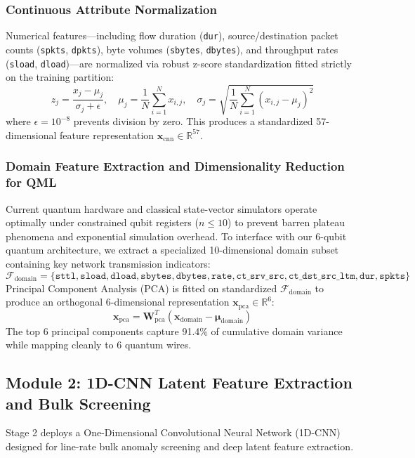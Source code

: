 \documentclass[preprint,12pt]{elsarticle}
\begin{document}
\subsubsection{Continuous Attribute Normalization}
Numerical features—including flow duration (\texttt{dur}), source/destination packet counts (\texttt{spkts}, \texttt{dpkts}), byte volumes (\texttt{sbytes}, \texttt{dbytes}), and throughput rates (\texttt{sload}, \texttt{dload})—are normalized via robust z-score standardization fitted strictly on the training partition:
\begin{equation}
    z_j = \frac{x_j - \mu_j}{\sigma_j + \epsilon}, \quad \mu_j = \frac{1}{N}\sum_{i=1}^N x_{i,j}, \quad \sigma_j = \sqrt{\frac{1}{N}\sum_{i=1}^N (x_{i,j} - \mu_j)^2}
\end{equation}
where $\epsilon = 10^{-8}$ prevents division by zero. This produces a standardized 57-dimensional feature representation $\mathbf{x}_{\text{cnn}} \in \mathbb{R}^{57}$.

\subsubsection{Domain Feature Extraction and Dimensionality Reduction for QML}
Current quantum hardware and classical state-vector simulators operate optimally under constrained qubit registers ($n \le 10$) to prevent barren plateau phenomena and exponential simulation overhead. To interface with our 6-qubit quantum architecture, we extract a specialized 10-dimensional domain subset containing key network transmission indicators:
\begin{equation}
    \mathcal{F}_{\text{domain}} = \{\texttt{sttl}, \texttt{sload}, \texttt{dload}, \texttt{sbytes}, \texttt{dbytes}, \texttt{rate}, \texttt{ct\_srv\_src}, \texttt{ct\_dst\_src\_ltm}, \texttt{dur}, \texttt{spkts}\}
\end{equation}
Principal Component Analysis (PCA) is fitted on standardized $\mathcal{F}_{\text{domain}}$ to produce an orthogonal 6-dimensional representation $\mathbf{x}_{\text{pca}} \in \mathbb{R}^6$:
\begin{equation}
    \mathbf{x}_{\text{pca}} = \mathbf{W}_{\text{pca}}^T (\mathbf{x}_{\text{domain}} - \boldsymbol{\mu}_{\text{domain}})
\end{equation}
The top 6 principal components capture 91.4\% of cumulative domain variance while mapping cleanly to 6 quantum wires.

\subsection{Module 2: 1D-CNN Latent Feature Extraction and Bulk Screening}
Stage 2 deploys a One-Dimensional Convolutional Neural Network (1D-CNN) designed for line-rate bulk anomaly screening and deep latent feature extraction.
\end{document}
